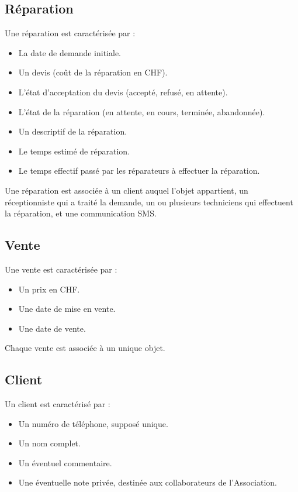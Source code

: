 \documentclass{article}
\begin{document}
\subsection*{Réparation}
Une réparation est caractérisée par :
\begin{itemize}
    \item La date de demande initiale.
    \item Un devis (coût de la réparation en CHF).
    \item L'état d'acceptation du devis (accepté, refusé, en attente).
    \item L'état de la réparation (en attente, en cours, terminée, abandonnée).
    \item Un descriptif de la réparation.
    \item Le temps estimé de réparation.
    \item Le temps effectif passé par les réparateurs à effectuer la réparation.
\end{itemize}

Une réparation est associée à un client auquel l'objet appartient, un réceptionniste qui a traité la demande, un ou plusieurs techniciens qui effectuent la réparation, et une communication SMS.

\subsection*{Vente}
Une vente est caractérisée par :
\begin{itemize}
    \item Un prix en CHF.
    \item Une date de mise en vente.
    \item Une date de vente.
\end{itemize}

Chaque vente est associée à un unique objet.

\subsection*{Client}
Un client est caractérisé par :
\begin{itemize}
    \item Un numéro de téléphone, supposé unique.
    \item Un nom complet.
    \item Un éventuel commentaire.
    \item Une éventuelle note privée, destinée aux collaborateurs de l'Association.
\end{itemize}
\end{document}
